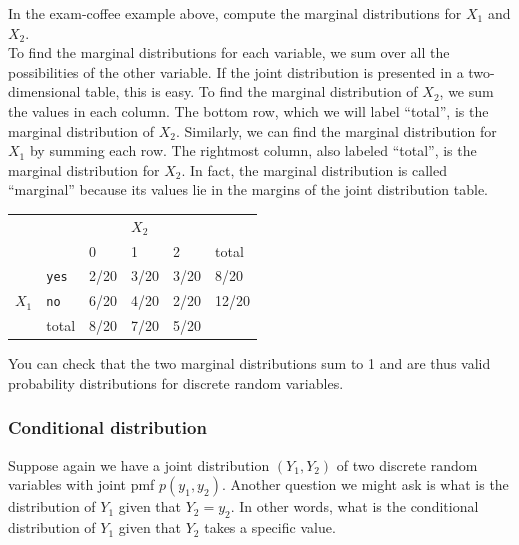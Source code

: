 \documentclass[notes.tex]{subfiles}
\begin{document}
\begin{example}In the exam-coffee example above, compute the marginal distributions for $X_1$ and $X_2$.\\

To find the marginal distributions for each variable, we sum over all the possibilities of the other variable. If the joint distribution is presented in a two-dimensional table, this is easy. To find the marginal distribution of $X_2$, we sum the values in each column. The bottom row, which we will label ``total'', is the marginal distribution of $X_2$. Similarly, we can find the marginal distribution for $X_1$ by summing each row. The rightmost column, also labeled ``total'', is the marginal distribution for $X_2$. In fact, the marginal distribution is called ``marginal'' because its values lie in the margins of the joint distribution table.

\begin{table}[H]
\centering
\begin{tabular}{llllll}
                       &                                 &      & $X_2$   &                           &       \\ \cline{3-5}
                       &                                 & 0    & 1    & 2                         & total \\ \cline{3-5}
\multicolumn{1}{l|}{}  & \multicolumn{1}{l|}{\texttt{yes}}    & 2/20 & 3/20 & \multicolumn{1}{l|}{3/20} & 8/20  \\
\multicolumn{1}{l|}{$X_1$} & \multicolumn{1}{l|}{\texttt{no}} & 6/20 & 4/20 & \multicolumn{1}{l|}{2/20} & 12/20 \\ \cline{3-5}
                       & total                           & 8/20 & 7/20 & 5/20                      &      
\end{tabular}
\end{table}
You can check that the two marginal distributions sum to 1 and are thus valid probability distributions for discrete random variables.

\end{example}

\subsubsection{Conditional distribution}
Suppose again we have a joint distribution $(Y_1, Y_2)$ of two discrete random variables with joint pmf $p(y_1, y_2)$. Another question we might ask is what is the distribution of $Y_1$ given that $Y_2 = y_2$. In other words, what is the conditional distribution of $Y_1$ given that $Y_2$ takes a specific value.\\
\end{document}
